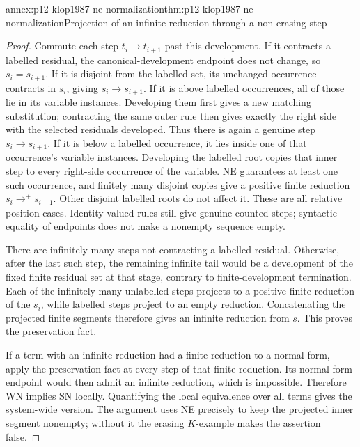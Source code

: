 \begin{annexitem}{annex:p12-klop1987-ne-normalization}{thm:p12-klop1987-ne-normalization}{Projection of an infinite reduction through a non-erasing step}
\begin{proof}
Commute each step \(t_i\to t_{i+1}\) past this development.
If it contracts a labelled residual, the canonical-development endpoint
does not change, so \(s_i=s_{i+1}\). If it is disjoint from the
labelled set, its unchanged occurrence contracts in \(s_i\), giving
\(s_i\to s_{i+1}\). If it is above labelled occurrences, all of
those lie in its variable instances. Developing them first gives a new
matching substitution; contracting the same outer rule then gives exactly
the right side with the selected residuals developed. Thus there is again
a genuine step \(s_i\to s_{i+1}\). If it is below a labelled
occurrence, it lies inside one of that occurrence's variable instances.
Developing the labelled root copies that inner step to every right-side
occurrence of the variable. NE guarantees at least one such occurrence,
and finitely many disjoint copies give a positive finite reduction
\(s_i\to^+s_{i+1}\). Other disjoint labelled roots do not affect
it. These are all relative position cases. Identity-valued rules still
give genuine counted steps; syntactic equality of endpoints does not
make a nonempty sequence empty.

There are infinitely many steps not contracting a labelled residual.
Otherwise, after the last such step, the remaining infinite tail would
be a development of the fixed finite residual set at that stage, contrary
to finite-development termination. Each of the infinitely many unlabelled
steps projects to a positive finite reduction of the \(s_i\), while
labelled steps project to an empty reduction. Concatenating the projected
finite segments therefore gives an infinite reduction from \(s\).
This proves the preservation fact.

If a term with an infinite reduction had a finite reduction to a normal
form, apply the preservation fact at every step of that finite reduction.
Its normal-form endpoint would then admit an infinite reduction, which
is impossible. Therefore WN implies SN locally. Quantifying the local
equivalence over all terms gives the system-wide version. The argument
uses NE precisely to keep the projected inner segment nonempty; without
it the erasing \(K\)-example makes the assertion false.
\end{proof}
\end{annexitem}

